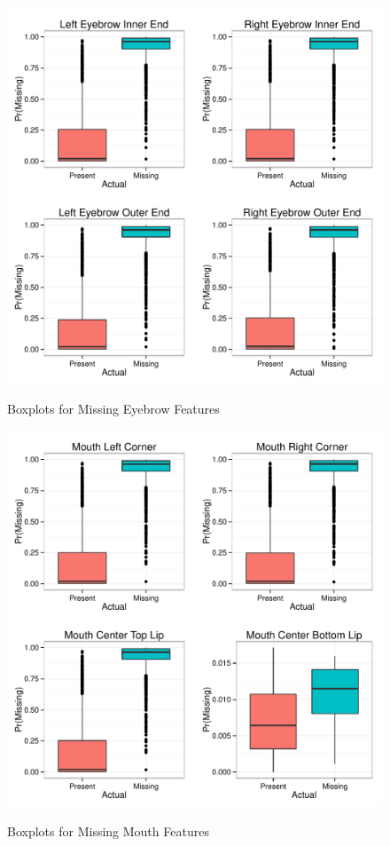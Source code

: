 \documentclass[journal]{IEEEtran}
\begin{document}
\begin{figure}[!ht]
  \centering
  \caption{Boxplots for Missing Eyebrow Features}
  \includegraphics[scale=.5]{logistic_boxplots_eyebrow.pdf}
  \label{fig:logistic_boxplots_eyebrow}
\end{figure}

\begin{figure}[!ht]
  \centering
  \caption{Boxplots for Missing Mouth Features}
  \includegraphics[scale=.5]{logistic_boxplots_mouth.pdf}
  \label{fig:logistic_boxplots_mouth}
\end{figure}
\end{document}
